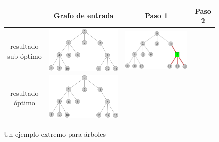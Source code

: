 	\begin{figure}[H]
	\caption{Un ejemplo extremo para \'arboles}
	\label{fig:extremo_arboles}
	\begin{center}
		\begin{tabular}{|c||c||c||c|}
		\hline
		& Grafo de entrada & Paso 1 & Paso 2 \\ 
			\hline
			resultado sub-\'optimo &
			\includegraphics[scale = 0.2]{img/ej3/constructiva_golosa/extremetree_st0.png} &
			\includegraphics[scale = 0.2]{img/ej3/constructiva_golosa/extremetree_st11.png} & \\
			\hline
			resultado \'optimo &
			\includegraphics[scale = 0.2]{img/ej3/constructiva_golosa/extremetree_st0.png} &

\end{tabular}
\end{center}
\end{figure}
